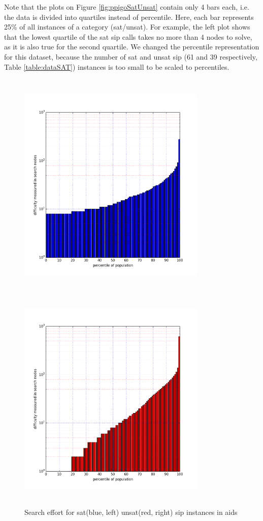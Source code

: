 \documentclass{l4proj}
\newcounter{example}[section]
\begin{document}
Note that the plots on Figure \ref{fig:ppigoSatUnsat} contain only 4 bars each, i.e. the data is divided into quartiles instead of percentile. Here, each bar represents 25\% of all instances of a category (\gls{sat}/\gls{unsat}). For example, the left plot shows that the lowest quartile of the \gls{sat} \gls{sip} calls takes no more than 4 nodes to solve, as it is also true for the second quartile. We changed the percentile representation for this dataset, because the number of \gls{sat} and \gls{unsat} \gls{sip} (61 and 39 respectively, Table \ref{table:dataSAT}) instances is too small to be scaled to percentiles.
\begin{figure}
\centering
\begin{minipage}[t]{.5\textwidth}
  \centering
  \includegraphics[height=11cm,width=9cm]{images/plots/aidsSAT.png}
\end{minipage}%
\begin{minipage}[t]{.5\textwidth}
  \centering
  \includegraphics[height=11cm,width=9cm]{images/plots/aidsUNSAT.png}
\end{minipage}
\caption{Search effort for \gls{sat}(blue, left) \gls{unsat}(red, right) \gls{sip} instances in aids}
\label{fig:aidsSatUnsat}
\end{figure}
\end{document}
